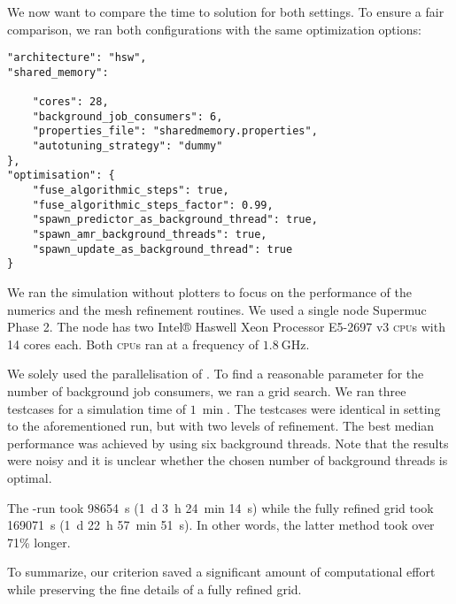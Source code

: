 We now want to compare the time to solution for both settings.
To ensure a fair comparison, we ran both configurations with the same optimization options:
\begin{verbatim}
"architecture": "hsw",
"shared_memory": 

    "cores": 28,
    "background_job_consumers": 6,
    "properties_file": "sharedmemory.properties",
    "autotuning_strategy": "dummy"
},
"optimisation": {
    "fuse_algorithmic_steps": true,
    "fuse_algorithmic_steps_factor": 0.99,
    "spawn_predictor_as_background_thread": true,
    "spawn_amr_background_threads": true,
    "spawn_update_as_background_thread": true
}
\end{verbatim}
We ran the simulation without plotters to focus on the performance of the numerics and the mesh refinement routines.
We used a single node Supermuc Phase 2.
The node has two Intel® Haswell Xeon Processor E5-2697 v3 \textsc{cpu}s with 14 cores each.
Both \textsc{cpu}s ran at a frequency of $\SI{1.8}{\GHz}$.

We solely used the \tbb{} parallelisation of \exahype{}.
To find a reasonable parameter for the number of background job consumers, we ran a grid search.
We ran three \amr{} testcases for a simulation time of $\SI{1}{\min}$.
The testcases were identical in setting to the aforementioned \amr{} run, but with two levels of refinement.
The best median performance was achieved by using six background threads.
Note that the results were noisy and it is unclear whether the chosen number of background threads is optimal.

The \amr{}-run took \SI{98654}{\s} (\SI{1}{\day} \SI{3}{\hour} \SI{24}{\minute} \SI{14}{\s})
while the fully refined grid took \SI{169071}{\s} (\SI{1}{\day} \SI{22}{\hour} \SI{57}{\minute} \SI{51}{\s}).
In other words, the latter method took over 71\% longer.

To summarize, our \amr{} criterion saved a significant amount of computational effort while preserving the fine details of a fully refined grid.

